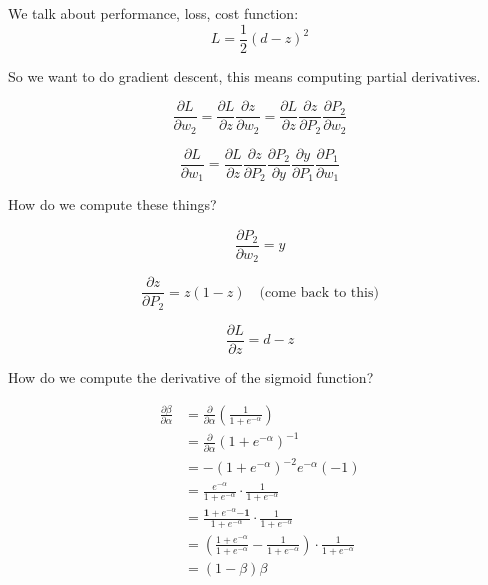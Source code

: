 We talk about performance, loss, cost function:
\begin{displaymath}
  L = \frac{1}{2} (d-z)^2
\end{displaymath}

So we want to do gradient descent, this means computing partial derivatives.

\begin{displaymath}
  \frac{\partial L}{\partial w_2}
  =
  \frac{\partial L}{\partial z}
  \frac{\partial z}{\partial w_2}
  =
  \frac{\partial L}{\partial z}
  \frac{\partial z}{\partial P_2}
  \frac{\partial P_2}{\partial w_2}
\end{displaymath}

\begin{displaymath}
  \frac{\partial L}{\partial w_1}
  =
  \frac{\partial L}{\partial z}
  \frac{\partial z}{\partial P_2}
  \frac{\partial P_2}{\partial y}
  \frac{\partial y}{\partial P_1}
  \frac{\partial P_1}{\partial w_1}
\end{displaymath}

How do we compute these things?

\begin{displaymath}
  \frac{\partial P_2}{\partial w_2} = y
\end{displaymath}

\begin{displaymath}
  \frac{\partial z}{\partial P_2} = z(1-z) \quad \mbox{(come back to this)}
\end{displaymath}

\begin{displaymath}
  \frac{\partial L}{\partial z} = d-z
\end{displaymath}

How do we compute the derivative of the sigmoid function?


\begin{align*}
  \frac{\partial\beta}{\partial\alpha}
  & = \frac{\partial}{\partial\alpha} \left( \frac{1}{1+e^{-\alpha}} \right) \\[3mm]
  & = \frac{\partial}{\partial\alpha} \left(1+e^{-\alpha}\right)^{-1} \\[3mm]
  & = -\left(1+e^{-\alpha}\right)^{-2} e^{-\alpha} (-1) \\[3mm]
  & = \frac{e^{-\alpha}}{1+e^{-\alpha}} \cdot \frac{1}{1+e^{-\alpha}} \\[3mm]
  & = \frac{\mathbf{1+} e^{-\alpha} \mathbf{-1}}{1+e^{-\alpha}} \cdot \frac{1}{1+e^{-\alpha}} \\[3mm]
  & = \left(\frac{1+e^{-\alpha}}{1+e^{-\alpha}} - \frac{1}{1+e^{-\alpha}}\right)
    \cdot \frac{1}{1+e^{-\alpha}} \\[3mm]
  & = (1-\beta)\beta
\end{align*}

